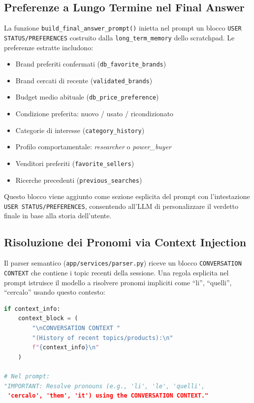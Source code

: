 \subsection{Preferenze a Lungo Termine nel Final Answer}
\label{subsec:ltm-preferences}

La funzione \texttt{build\_final\_answer\_prompt()} inietta nel prompt
un blocco \texttt{USER STATUS/PREFERENCES} costruito dalla
\texttt{long\_term\_memory} dello scratchpad. Le preferenze estratte
includono:

\begin{itemize}
    \item Brand preferiti confermati (\texttt{db\_favorite\_brands})
    \item Brand cercati di recente (\texttt{validated\_brands})
    \item Budget medio abituale (\texttt{db\_price\_preference})
    \item Condizione preferita: nuovo / usato / ricondizionato
    \item Categorie di interesse (\texttt{category\_history})
    \item Profilo comportamentale: \emph{researcher} o \emph{power\_buyer}
    \item Venditori preferiti (\texttt{favorite\_sellers})
    \item Ricerche precedenti (\texttt{previous\_searches})
\end{itemize}

Questo blocco viene aggiunto come sezione esplicita del prompt con
l'intestazione \texttt{USER STATUS/PREFERENCES}, consentendo all'LLM
di personalizzare il verdetto finale in base alla storia dell'utente.

\subsection{Risoluzione dei Pronomi via Context Injection}
\label{subsec:pronoun-resolution}

Il parser semantico (\texttt{app/services/parser.py}) riceve un blocco
\texttt{CONVERSATION CONTEXT} che contiene i topic recenti della sessione.
Una regola esplicita nel prompt istruisce il modello a risolvere pronomi
impliciti come ``li'', ``quelli'', ``cercalo'' usando questo contesto:

\begin{lstlisting}[language=Python,caption={Iniezione del contesto conversazionale nel parser (app/services/parser.py)},label=lst:context-injection]
if context_info:
    context_block = (
        "\nCONVERSATION CONTEXT "
        "(History of recent topics/products):\n"
        f"{context_info}\n"
    )

# Nel prompt:
"IMPORTANT: Resolve pronouns (e.g., 'li', 'le', 'quelli',
 'cercalo', 'them', 'it') using the CONVERSATION CONTEXT."
\end{lstlisting}


